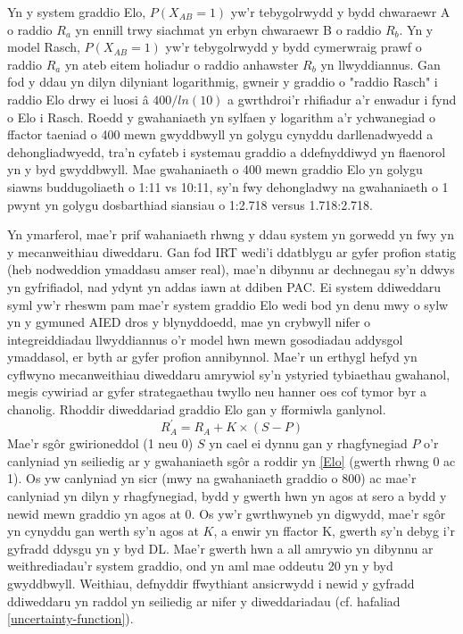 Yn y system graddio Elo, $P(X_{AB} = 1)$ yw'r tebygolrwydd y bydd chwaraewr A o raddio $R_a$ yn ennill trwy siachmat yn erbyn chwaraewr B o raddio $R_b$. Yn y model Rasch, $P(X_{AB} = 1)$ yw'r tebygolrwydd y bydd cymerwraig prawf o raddio $R_a$ yn ateb eitem holiadur o raddio anhawster $R_b$ yn llwyddiannus. Gan fod y ddau yn dilyn dilyniant logarithmig, gwneir y graddio o "raddio Rasch" i raddio Elo drwy ei luosi â $400/ln(10)$ a gwrthdroi'r rhifiadur a'r enwadur i fynd o Elo i Rasch. Roedd y gwahaniaeth yn sylfaen y logarithm a'r ychwanegiad o ffactor taeniad o 400 mewn gwyddbwyll yn golygu cynyddu darllenadwyedd a dehongliadwyedd, tra'n cyfateb i systemau graddio a ddefnyddiwyd yn flaenorol yn y byd gwyddbwyll. Mae gwahaniaeth o 400 mewn graddio Elo yn golygu siawns buddugoliaeth o 1:11 vs 10:11, sy'n fwy dehongladwy na gwahaniaeth o 1 pwynt yn golygu dosbarthiad siansiau o 1:2.718 versus 1.718:2.718.

Yn ymarferol, mae'r prif wahaniaeth rhwng y ddau system yn gorwedd yn fwy yn y mecanweithiau diweddaru. Gan fod IRT wedi'i ddatblygu ar gyfer profion statig (heb nodweddion ymaddasu amser real), mae'n dibynnu ar dechnegau sy'n ddwys yn gyfrifiadol, nad ydynt yn addas iawn at ddiben PAC. Ei system ddiweddaru syml yw'r rheswm pam mae'r system graddio Elo wedi bod yn denu mwy o sylw yn y gymuned AIED dros y blynyddoedd, mae \cite{pelanek_applications_2016} yn crybwyll nifer o integreiddiadau llwyddiannus o'r model hwn mewn gosodiadau addysgol ymaddasol, er byth ar gyfer profion annibynnol. Mae'r un erthygl hefyd yn cyflwyno mecanweithiau diweddaru amrywiol sy'n ystyried tybiaethau gwahanol, megis cywiriad ar gyfer strategaethau twyllo neu hanner oes cof tymor byr a chanolig. Rhoddir diweddariad graddio Elo gan y fformiwla ganlynol.
\begin{equation}
    R_{A}^{\prime}= R_A+K \times{(S-P)}
    \label{Update Elo}
\end{equation}
Mae'r sgôr gwirioneddol (1 neu 0) $S$ yn cael ei dynnu gan y rhagfynegiad $P$ o'r canlyniad yn seiliedig ar y gwahaniaeth sgôr a roddir yn \ref{Elo} (gwerth rhwng 0 ac 1). Os yw canlyniad yn sicr (mwy na gwahaniaeth graddio o 800) ac mae'r canlyniad yn dilyn y rhagfynegiad, bydd y gwerth hwn yn agos at sero a bydd y newid mewn graddio yn agos at 0. Os yw'r gwrthwyneb yn digwydd, mae'r sgôr yn cynyddu gan werth sy'n agos at $K$, a enwir yn ffactor K, gwerth sy'n debyg i'r gyfradd ddysgu yn y byd DL. Mae'r gwerth hwn a all amrywio yn dibynnu ar weithrediadau'r system graddio, ond yn aml mae oddeutu 20 yn y byd gwyddbwyll. Weithiau, defnyddir ffwythiant ansicrwydd i newid y gyfradd ddiweddaru yn raddol yn seiliedig ar nifer y diweddariadau (cf. hafaliad \ref{uncertainty-function}).

